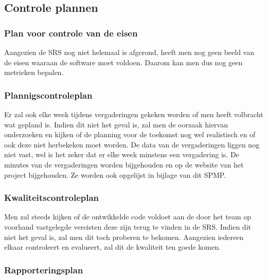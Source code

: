 \documentclass{article}
\begin{document}

\subsection{Controle plannen}


\subsubsection{Plan voor controle van de eisen}

Aangezien de SRS nog niet helemaal is afgerond, heeft men nog geen beeld van de eisen waaraan de software moet voldoen. Daarom kan men dus nog geen metrieken bepalen.


\subsubsection{Plannigscontroleplan}

Er zal ook elke week tijdens vergaderingen gekeken worden of men heeft volbracht wat gepland is. Indien dit niet het geval is, zal men de oorzaak hiervan onderzoeken en kijken of de planning voor de toekomst nog wel realistisch en of ook deze niet herbekeken moet worden. De data van de vergaderingen liggen nog niet vast, wel is het zeker dat er elke week minstens een vergadering is. De minutes van de vergaderingen worden bijgehouden en op de website van het project bijgehouden. Ze worden ook opgelijst in bijlage van dit SPMP.

\subsubsection{Kwaliteitscontroleplan}

Men zal steeds kijken of de ontwikkelde code voldoet aan de door het team op voorhand vastgelegde vereisten deze zijn terug te vinden in de SRS. Indien dit niet het geval is, zal men dit toch proberen te bekomen.
Aangezien iedereen elkaar controleert en evalueert, zal dit de kwaliteit ten goede komen.

\subsubsection{Rapporteringsplan}
\end{document}
